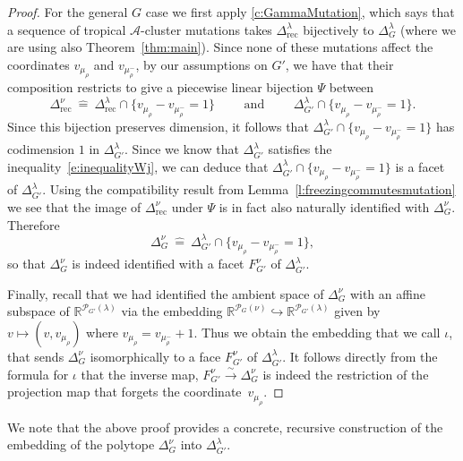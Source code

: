 \documentclass{amsart}
\theoremstyle{definition}
\numberwithin{equation}{section}
\newcommand{\R}{\mathbb R}
\newcommand{\rect}{\mathrm{rec}}
\begin{document}
\begin{proof}
For the general $G$ case we first apply \cref{c:GammaMutation}, which says that 
a sequence of tropical $\mathcal A$-cluster mutations  takes $\Delta_\rect^\lambda$ bijectively to $\Delta_G^\lambda$ (where we are using also Theorem~\ref{thm:main}). Since none of these mutations affect the coordinates 
$v_{\mu_{\rho}}$ and $v_{\mu_{\rho}^-}$, by our assumptions on $G'$, we have that their composition restricts to give a piecewise linear bijection $\Psi$ between
\[
\Delta^\nu_\rect\ \hat{=}\ \Delta_\rect^\lambda \cap \{v_{\mu_{\rho}}- v_{\mu_{\rho}^-}=1\} \qquad \text{ and }\qquad
\Delta_{G'}^\lambda \cap \{v_{\mu_{\rho}}- v_{\mu_{\rho}^-}=1\}.
 \]
Since this bijection preserves dimension, it follows that $\Delta_{G'}^\lambda \cap \{v_{\mu_{\rho}}- v_{\mu_{\rho}^-}=1\}$ has codimension $1$ in $\Delta_{G'}^\lambda$. Since we know that $\Delta_{G'}^\lambda$ satisfies the inequality~\eqref{e:inequalityWj}, we can deduce that $\Delta_{G'}^\lambda \cap \{v_{\mu_{\rho}}- v_{\mu_{\rho}^-}=1\}$  is a facet of $\Delta_{G'}^\lambda$. Using the compatibility result from Lemma~\ref{l:freezingcommutesmutation} we see that the image of $\Delta^\nu_\rect$ under $\Psi$ is in fact also naturally identified with $\Delta^\nu_G$. Therefore 
\[
\Delta^\nu_G\ \hat=\ \Delta_{G'}^\lambda \cap \{v_{\mu_{\rho}}- v_{\mu_{\rho}^-}=1\},
\]
so that $\Delta^\nu_G$ is indeed identified with a facet $F_{G'}^\nu$ of $\Delta_{G'}^\lambda$. 

Finally, recall that we had identified the ambient space of $\Delta^\nu_G$ with an affine subspace of $\R^{\mathcal P_{G'}(\lambda)}$ via the embedding $\R^{\mathcal P_G(\nu)}\hookrightarrow \R^{\mathcal P_{G'}(\lambda)}$ given by $v\mapsto ( v,v_{\mu_\rho})$ where $v_{\mu_\rho}=v_{\mu_{\rho}^-}+1$. Thus we obtain the embedding that we call $\iota$, that sends $\Delta^\nu_G$ isomorphically to a face $F_{G'}^\nu$ of $\Delta^\lambda_{G'}$. It follows directly from the formula for $\iota$ that the inverse map, $F_{G'}^\nu\overset\sim\to \Delta^\nu_G$ is indeed the restriction of the projection map that forgets the coordinate~$v_{\mu_\rho}$. 
\end{proof}

We note that the above proof provides a concrete, recursive construction of the embedding of the polytope $\Delta^\nu_G$ into $\Delta^\lambda_{G'}$.
\end{document}
